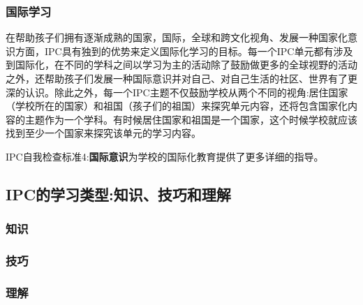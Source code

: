 \subsubsection{国际学习}
    在帮助孩子们拥有逐渐成熟的国家，国际，全球和跨文化视角、发展一种国家化意识方面，IPC具有独到的优势来定义国际化学习的目标。每一个IPC单元都有涉及到国际化，在不同的学科之间以学习为主的活动除了鼓励做更多的全球视野的活动之外，还帮助孩子们发展一种国际意识并对自己、对自己生活的社区、世界有了更深的认识。除此之外，每一个IPC主题不仅鼓励学校从两个不同的视角:居住国家（学校所在的国家）和祖国（孩子们的祖国）来探究单元内容，还将包含国家化内容的主题作为一个学科。有时候居住国家和祖国是一个国家，这个时候学校就应该找到至少一个国家来探究该单元的学习内容。\par
    IPC自我检查标准4:\textbf{国际意识}为学校的国际化教育提供了更多详细的指导。

\subsection{IPC的学习类型:知识、技巧和理解}


\subsubsection{知识}


\subsubsection{技巧}

\subsubsection{理解}




